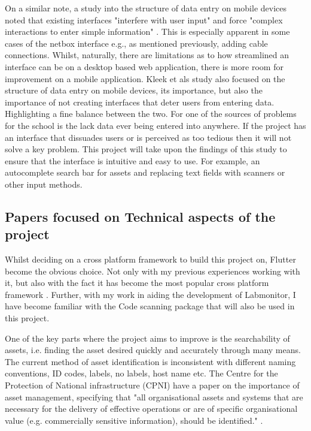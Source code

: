 \documentclass [11pt,a4paper]{article}
\begin{document}
On a similar note, a study into the structure of data entry on mobile devices noted that existing interfaces "interfere with user input" and force "complex interactions to enter simple information" \cite{van2007gui}. This is especially apparent in some cases of the netbox interface e.g., as mentioned previously, adding cable connections. Whilst, naturally, there are limitations as to how streamlined an interface can be on a desktop based web application, there is more room for improvement on a mobile application. Kleek et als \cite{van2007gui} study also focused on the structure of data entry on mobile devices, its importance, but also the importance of not creating interfaces that deter users from entering data. Highlighting a fine balance between the two. For one of the sources of problems for the school is the lack data ever being entered into anywhere. If the project has an interface that dissuades users or is perceived as too tedious then it will not solve a key problem. This project will take upon the findings of this study to ensure that the interface is intuitive and easy to use. For example, an autocomplete search bar for assets and replacing text fields with scanners or other input methods. 

\subsection{Papers focused on Technical aspects of the project}
\label{sec:technical}

Whilst deciding on a cross platform framework to build this project on, Flutter become the obvious choice. Not only with my previous experiences working with it, but also with the fact it has become the most popular cross platform framework \cite{JetBrainsFlutter}. Further, with my work in aiding the development of Labmonitor\cite{labmonitor}, I have become familiar with the Code scanning package that will also be used in this project\cite{barcodeScannerPlugin}.

One of the key parts where the project aims to improve is the searchability of assets, i.e. finding the asset desired quickly and accurately through many means. The current method of asset identification is inconsistent with different naming conventions, ID codes, labels, no labels, host name etc. The Centre for the Protection of National infrastructure (CPNI) have a paper on the importance of asset management, specifying that "all organisational assets and systems that are necessary for the delivery of effective operations or are of specific organisational value (e.g. commercially sensitive information), should be identified." \cite{cpni}.
\end{document}
